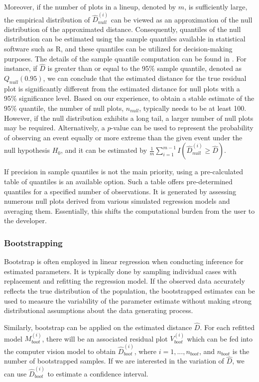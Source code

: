 \documentclass[]{interact}
\theoremstyle{plain}%
\theoremstyle{definition}
\theoremstyle{remark}
\begin{document}
Moreover, if the number of plots in a lineup, denoted by \(m\), is
sufficiently large, the empirical distribution of
\({\hat{D}_{null}^{(i)}}\) can be viewed as an approximation of the null
distribution of the approximated distance. Consequently, quantiles of
the null distribution can be estimated using the sample quantiles
available in statistical software such as R, and these quantiles can be
utilized for decision-making purposes. The details of the sample
quantile computation can be found in \citet{hyndman1996sample}. For
instance, if \(\hat{D}\) is greater than or equal to the 95\% sample
quantile, denoted as \(Q_{null}(0.95)\), we can conclude that the
estimated distance for the true residual plot is significantly different
from the estimated distance for null plots with a 95\% significance
level. Based on our experience, to obtain a stable estimate of the 95\%
quantile, the number of null plots, \(n_{null}\), typically needs to be
at least 100. However, if the null distribution exhibits a long tail, a
larger number of null plots may be required. Alternatively, a
\(p\)-value can be used to represent the probability of observing an
event equally or more extreme than the given event under the null
hypothesis \(H_0\), and it can be estimated by
\(\frac{1}{m}\sum_{i=1}^{m-1}I\left(\hat{D}_{null}^{(i)} \geq \hat{D}\right)\).

If precision in sample quantiles is not the main priority, using a
pre-calculated table of quantiles is an available option. Such a table
offers pre-determined quantiles for a specified number of observations.
It is generated by assessing numerous null plots derived from various
simulated regression models and averaging them. Essentially, this shifts
the computational burden from the user to the developer.

\subsubsection{Bootstrapping}\label{bootstrapping}

Bootstrap is often employed in linear regression when conducting
inference for estimated parameters. It is typically done by sampling
individual cases with replacement and refitting the regression model. If
the observed data accurately reflects the true distribution of the
population, the bootstrapped estimates can be used to measure the
variability of the parameter estimate without making strong
distributional assumptions about the data generating process.

Similarly, bootstrap can be applied on the estimated distance
\(\hat{D}\). For each refitted model \(M_{boot}^{(i)}\), there will be
an associated residual plot \(V_{boot}^{(i)}\) which can be fed into the
computer vision model to obtain \(\hat{D}_{boot}^{(i)}\), where
\(i = 1,...,n_{boot}\), and \(n_{boot}\) is the number of bootstrapped
samples. If we are interested in the variation of \(\hat{D}\), we can
use \(\hat{D}_{boot}^{(i)}\) to estimate a confidence interval.
\end{document}
